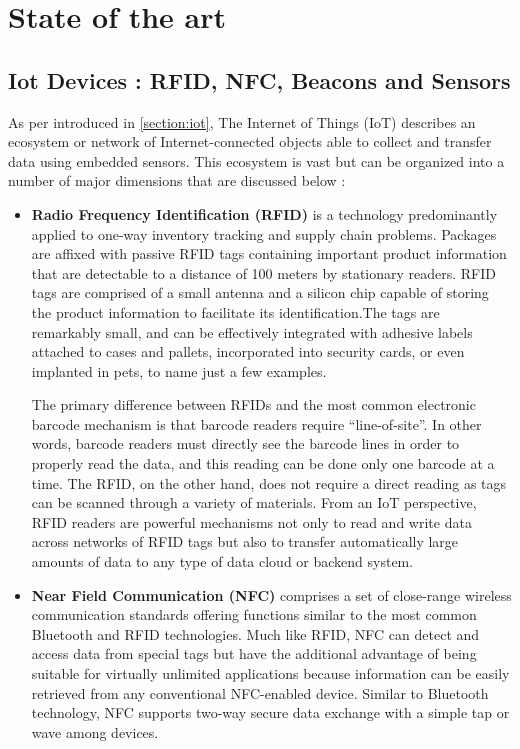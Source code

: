 \chead{}
\chapter{State of the art}

\section{Iot Devices : RFID, NFC, Beacons and Sensors}

As per introduced in \ref{section:iot}, The Internet of Things (IoT) describes an ecosystem or network of Internet-connected objects able to collect and transfer data using embedded sensors. This ecosystem is vast but can be organized into a number of major dimensions that are discussed below : 

\begin{itemize}
  \item \textbf{Radio Frequency Identification (RFID) } is a technology predominantly applied to one-way inventory tracking and supply chain problems. Packages are affixed with passive RFID tags containing important product information that are detectable to a distance of 100 meters by stationary readers. RFID tags are comprised of a small antenna and a silicon chip capable of storing the product information to facilitate its identification.The tags are remarkably small, and can be effectively integrated with adhesive labels attached to cases and pallets, incorporated into security cards, or even implanted in pets, to name just a few examples.
  
  The primary difference between RFIDs and the most common electronic barcode mechanism is that barcode readers require “line-of-site”. In other words, barcode readers must directly see the barcode lines in order to properly read the data, and this reading can be done only one barcode at a time. The RFID, on the other hand, does not require a direct reading as
tags can be scanned through a variety of materials. From an IoT perspective, RFID readers are powerful mechanisms not only to read and write data across networks of RFID tags but also to transfer automatically large amounts of data to any type of data cloud or backend system.

  \item \textbf{Near Field Communication (NFC) } comprises a set of close-range wireless communication standards offering functions similar to the most common Bluetooth and RFID technologies. Much like RFID, NFC can detect and access data from special tags but have the additional advantage of being suitable for virtually unlimited applications because information can be easily retrieved from any conventional NFC-enabled device. Similar to Bluetooth technology, NFC supports two-way secure data exchange with a simple tap or wave among devices.
  

\end{itemize}
